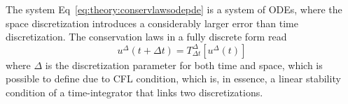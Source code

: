 
The system Eq~\eqref{eq:theory:conservlawsodepde} is a system of \acp{ODE}, where the space discretization introduces a considerably larger error than time discretization.
The conservation laws in a fully discrete form read 
%
\begin{equation}
u^{\Delta}(t+\Delta t) = T^{\Delta} _{\Delta t}[u^{\Delta}(t)]
\end{equation}
%
where $\Delta$ is the discretization parameter for both time and space, which is 
possible to define due to \ac{CFL} condition, which is, in essence, a linear stability
condition of a time-integrator that links two discretizations. 

